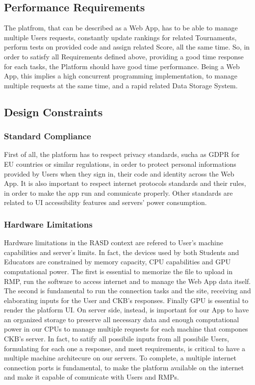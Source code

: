 \subsection{Performance Requirements}
The platfrom, that can be described as a Web App, has to be able to manage multiple Users requests, constantly update rankings for related Tournaments, perform tests on provided code and assign related Score, all the same time. So, in order to satisfy all Requirements defined above, providing a good time response for each tasks, the Platform should have good time performance. Being a Web App, this implies a high concurrent programming implementation, to manage multiple requests at the same time, and a rapid related Data Storage System. 
\subsection{Design Constraints}

\subsubsection{Standard Compliance}
First of all, the platform has to respect privacy standards, sucha as GDPR for EU countries or similar regulations, in order to protect personal informations provided by Users when they sign in, their code and identity across the Web App. It is also important to respect internet protocols standards and their rules, in order to make the app run and comunicate properly. Other standards are related to UI accessibility features and servers' power consumption. 
\subsubsection{Hardware Limitations}
Hardware limitations in the RASD context are refered to User's machine capabilities and server's limits. In fact, the devices used by both Students and Educators are constrained by memory capacity, CPU capabilities and GPU computational power. The first is essential to memorize the file to upload in RMP, run the software to access internet and to manage the Web App data itself. The second is fundamental to run the connection tasks and the site, receiving and elaborating inputs for the User and CKB's responses. Finally GPU is essential to render the platform UI. On server side, instead, is important for our App to have an organized storage to preserve all necessary data and enough computational power in our CPUs to manage multiple requests for each machine that compones CKB's server. In fact, to satify all possibile inputs from all possibile Users, formulating for each one a response, and meet requirements, is critical to have a multiple machine architecure on our servers. To complete, a multiple internet connection ports is fundamental, to make the platform available on the internet and make it capable of comunicate with Users and RMPs.
